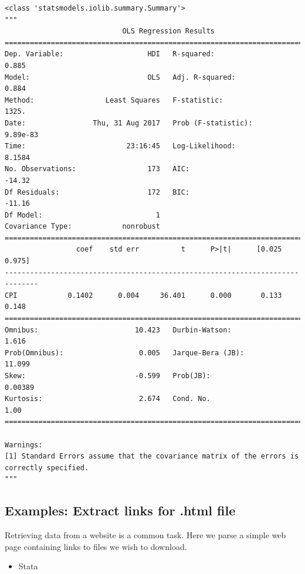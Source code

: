 \documentclass[
]{book}
\providecommand{\tightlist}{%
  \setlength{\itemsep}{0pt}\setlength{\parskip}{0pt}}
\begin{document}
\begin{verbatim}
<class 'statsmodels.iolib.summary.Summary'>
"""
                            OLS Regression Results                            
==============================================================================
Dep. Variable:                    HDI   R-squared:                       0.885
Model:                            OLS   Adj. R-squared:                  0.884
Method:                 Least Squares   F-statistic:                     1325.
Date:                Thu, 31 Aug 2017   Prob (F-statistic):           9.89e-83
Time:                        23:16:45   Log-Likelihood:                 8.1584
No. Observations:                 173   AIC:                            -14.32
Df Residuals:                     172   BIC:                            -11.16
Df Model:                           1                                         
Covariance Type:            nonrobust                                         
==============================================================================
                 coef    std err          t      P>|t|      [0.025      0.975]
------------------------------------------------------------------------------
CPI            0.1402      0.004     36.401      0.000       0.133       0.148
==============================================================================
Omnibus:                       10.423   Durbin-Watson:                   1.616
Prob(Omnibus):                  0.005   Jarque-Bera (JB):               11.099
Skew:                          -0.599   Prob(JB):                      0.00389
Kurtosis:                       2.674   Cond. No.                         1.00
==============================================================================

Warnings:
[1] Standard Errors assume that the covariance matrix of the errors is correctly specified.
"""
\end{verbatim}

\hypertarget{examples-extract-links-for-.html-file}{%
\subsection{Examples: Extract links for .html file}\label{examples-extract-links-for-.html-file}}

Retrieving data from a website is a common task. Here we parse a simple web page containing links to files we wish to download.

\begin{itemize}
\tightlist
\item
  Stata
\end{itemize}
\end{document}
